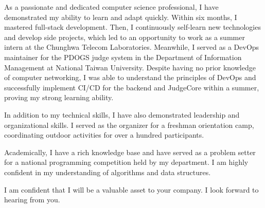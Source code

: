 \documentclass[a4paper,11pt]{article}
\begin{document}
As a passionate and dedicated computer science professional, I have demonstrated my ability to learn and adapt quickly. Within six months, I mastered full-stack development. Then, I continuously self-learn new technologies and develop side projects, which led to an opportunity to work as a summer intern at the Chunghwa Telecom Laboratories. Meanwhile, I served as a DevOps maintainer for the PDOGS judge system in the Department of Information Management at National Taiwan University. Despite having no prior knowledge of computer networking, I was able to understand the principles of DevOps and successfully implement CI/CD for the backend and JudgeCore within a summer, proving my strong learning ability.

In addition to my technical skills, I have also demonstrated leadership and organizational skills. I served as the organizer for a freshman orientation camp, coordinating outdoor activities for over a hundred participants.

Academically, I have a rich knowledge base and have served as a problem setter for a national programming competition held by my department. I am highly confident in my understanding of algorithms and data structures.

I am confident that I will be a valuable asset to your company. I look forward to hearing from you.



\end{document}
